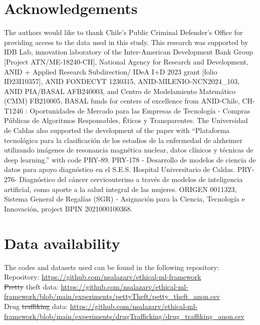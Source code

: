 \documentclass[fleqn,10pt]{wlscirep}
\providecommand{\DIFadd}[1]{{\protect\color{blue}\uwave{#1}}} %
\providecommand{\DIFdel}[1]{{\protect\color{red}\sout{#1}}}                      %
\providecommand{\DIFaddbegin}{} %
\providecommand{\DIFaddend}{} %
\providecommand{\DIFdelbegin}{} %
\providecommand{\DIFdelend}{} %
\begin{document}
\section*{Acknowledgements}

The authors would like to thank Chile's Public Criminal Defender’s Office for providing access to the data used in this study. This research was supported by IDB Lab, innovation laboratory of the Inter-American Development Bank Group [Project ATN/ME-18240-CH], National Agency for Research and Development, ANID + Applied Research Subdirection/ IDeA I+D 2023 grant [folio ID23I10357], ANID FONDECYT 1230315, ANID-MILENIO-NCN2024\_103, ANID PIA/BASAL AFB240003, and Centro de Modelamiento Matemático (CMM) FB210005, BASAL funds for centers of excellence from ANID-Chile, CH-T1246 : Oportunidades de Mercado para las Empresas de Tecnología - Compras Públicas de Algoritmos Responsables, Éticos y Transparentes. The Universidad de Caldas also supported the development of the paper with “Plataforma tecnológica para la clasificación de los estadios de la enfermedad de alzheimer utilizando imágenes de resonancia magnética nuclear, datos clínicos y técnicas de deep learning.” with code PRY-89. PRY-178 - Desarrollo de modelos de ciencia de datos para apoyo diagnóstico en el S.E.S. Hospital Universitario de Caldas. PRY-276- Diagnóstico del cáncer cervicouterino a través de modelos de inteligencia artificial, como aporte a la salud integral de las mujeres. ORIGEN 0011323, Sistema General de Regalías (SGR) - Asignación para la Ciencia, Tecnología e Innovación, project BPIN 2021000100368.

\section*{Data availability}
The codes and datasets used can be found in the following repository: \\
Repository: \url{https://github.com/nsalazarv/ethical-ml-framework}
\\\DIFdelbegin \DIFdel{Pretty }\DIFdelend \DIFaddbegin \DIFadd{Petty }\DIFaddend theft data: \url{https://github.com/nsalazarv/ethical-ml-framework/blob/main/experiments/pettyTheft/petty_theft_anon.csv}
\\ Drug \DIFdelbegin \DIFdel{traffiking }\DIFdelend \DIFaddbegin \DIFadd{trafficking }\DIFaddend data: \url{https://github.com/nsalazarv/ethical-ml-framework/blob/main/experiments/drugTrafficking/drug_traffiking_anon.csv}

\clearpage
\end{document}
